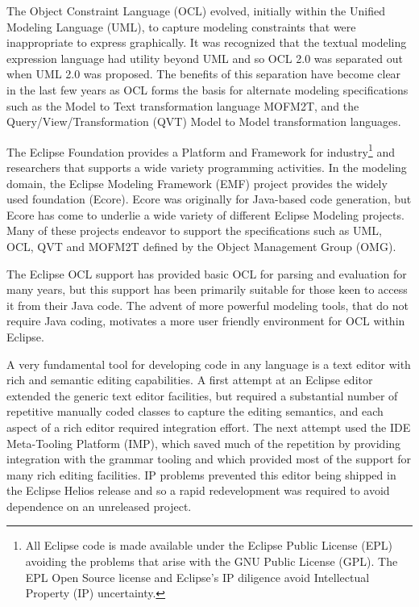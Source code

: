 \documentclass[runningheads,a4paper]{llncs}
\begin{document}
The Object Constraint Language (OCL)\cite{OCL} evolved, initially within the Unified Modeling Language (UML)\cite{UML}, to capture modeling constraints that were inappropriate to express graphically. It was recognized that the textual modeling expression language had utility beyond UML and so OCL 2.0 was separated out when UML 2.0 was proposed. The benefits of this separation have become clear in the last few years as OCL forms the basis for alternate modeling specifications such as the Model to Text transformation language MOFM2T\cite{MOFM2T}, and the Query/View/Transformation (QVT)\cite{QVT} Model to Model transformation languages.

The Eclipse Foundation provides a Platform and Framework for industry\footnote{All Eclipse code is made available under the Eclipse Public License (EPL) avoiding the problems that arise with the GNU Public License (GPL). The EPL Open Source license and Eclipse's IP diligence avoid Intellectual Property (IP) uncertainty.} and researchers that supports a wide variety programming activities.  In the modeling domain, the Eclipse Modeling Framework (EMF) project provides the widely used foundation (Ecore). Ecore was originally for Java-based code generation, but Ecore has come to underlie a wide variety of different Eclipse Modeling projects. Many of these projects endeavor to support the specifications such as UML, OCL, QVT and MOFM2T defined by the Object Management Group (OMG).

The Eclipse OCL\cite{MDT/OCL} support has provided basic OCL for parsing and evaluation for many years, but this support has been primarily suitable for those keen to access it from their Java code. The advent of more powerful modeling tools, that do not require Java coding, motivates a more user friendly environment for OCL within Eclipse.

A very fundamental tool for developing code in any language is a text editor with rich and semantic editing capabilities.
A first attempt at an Eclipse editor extended the generic text editor facilities, but required a substantial number of repetitive manually coded classes to capture the editing semantics, and each aspect of a rich editor required integration effort. The next attempt used the IDE Meta-Tooling Platform (IMP)\cite{IMP}, which saved much of the repetition by providing integration with the grammar tooling and which provided most of the support for many rich editing facilities. IP problems prevented this editor being shipped in the Eclipse Helios\cite{Helios} release and so a rapid redevelopment was required to avoid dependence on an unreleased project.
\end{document}
